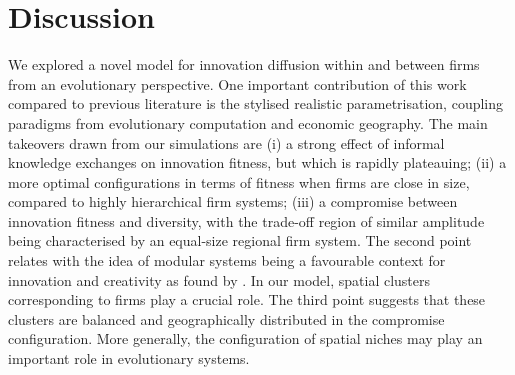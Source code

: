 \documentclass[letterpaper]{article}
\begin{document}


\section{Discussion}


We explored a novel model for innovation diffusion within and between firms from an evolutionary perspective. One important contribution of this work compared to previous literature is the stylised realistic parametrisation, coupling paradigms from evolutionary computation and economic geography. The main takeovers drawn from our simulations are (i) a strong effect of informal knowledge exchanges on innovation fitness, but which is rapidly plateauing; (ii) a more optimal configurations in terms of fitness when firms are close in size, compared to highly hierarchical firm systems; (iii) a compromise between innovation fitness and diversity, with the trade-off region of similar amplitude being characterised by an equal-size regional firm system. The second point relates with the idea of modular systems being a favourable context for innovation and creativity as found by \cite{dionne2019diversity}. In our model, spatial clusters corresponding to firms play a crucial role. The third point suggests that these clusters are balanced and geographically distributed in the compromise configuration. More generally, the configuration of spatial niches may play an important role in evolutionary systems.
\end{document}
